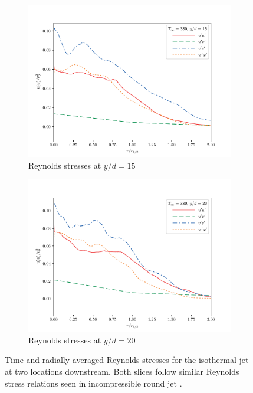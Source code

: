 \begin{figure}[hbtp!]
\begin{center}
\begin{subfigure}{0.45\textwidth}
	\includegraphics[scale=.45]{figures/Plots/radial/slices_5/same_ambient/Rey_Stress_0_15.pdf}
	\caption{Reynolds stresses at $y/d=15$} \label{330_rey_15}
\end{subfigure}
\begin{subfigure}{0.45\textwidth}
	\includegraphics[scale=.45]{figures/Plots/radial/slices_5/same_ambient/Rey_Stress_0_2.pdf}
	\caption{Reynolds stresses at $y/d=20$} \label{330_rey_20}
\end{subfigure}
\caption{Time and radially averaged Reynolds stresses for the isothermal jet at two locations downstream. Both slices follow similar Reynolds stress relations seen in incompressible round jet \cite{Pope}.}
\label{330_reynolds_features}
\end{center}
\end{figure}

